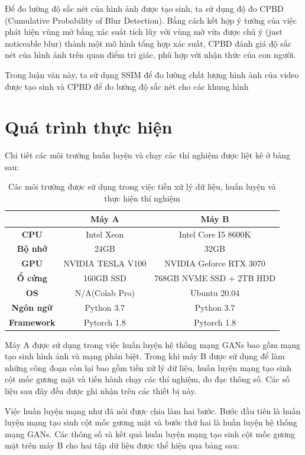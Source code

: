 Để đo lường độ sắc nét của hình ảnh được tạo sinh, ta sử dụng độ đo CPBD (Cumulative 
Probability of Blur Detection). Bằng cách kết hợp ý tưởng của việc phát hiện vùng mờ bằng xác suất tích lũy với vùng mờ vừa được chú ý (just noticeable blur) thành một mô hình tổng hợp xác suất, CPBD đánh giá độ sắc nét của hình ảnh trên quan điểm tri giác, phù hợp với nhận thức của con người.

Trong luận văn này, ta sử dụng SSIM để đo lường chất lượng hình ảnh của video được tạo sinh và CPBD để đo lường độ sắc nét cho các khung hình

\section{Quá trình thực hiện}

Chi tiết các môi trường huấn luyện và chạy các thí nghiệm được liệt kê ở bảng sau:

\begin{table}[h]
    \centering
    \begin{tabular}{c | c | c}
    \hline 
    &\textbf{Máy A} & \textbf{Máy B}\\
    \hline
    \textbf{CPU} & Intel Xeon & Intel Core I5 8600K\\
    \textbf{Bộ nhớ} & 24GB & 32GB\\
    \textbf{GPU} & NVIDIA TESLA V100 & NVIDIA Geforce RTX 3070\\
    \textbf{Ổ cứng} & 160GB SSD & 768GB NVME SSD + 2TB HDD\\
    \textbf{OS} & N/A(Colab Pro) & Ubuntu 20.04\\
    \textbf{Ngôn ngữ} & Python 3.7 & Python 3.7\\
    \textbf{Framework} & Pytorch 1.8 & Pytorch 1.8\\
    \hline
    \end{tabular}
    \caption{Các môi trường được sử dụng trong việc tiền xử lý dữ liệu, huấn luyện và thực hiện thí nghiệm}
    \label{table:hardware}
\end{table}

Máy A được sử dụng trong việc huấn luyện hệ thống mạng GANs bao gồm mạng tạo sinh hình ảnh và mạng phân biệt. Trong khi máy B được sử dụng để làm những công đoạn còn lại bao gồm tiền xử lý dữ liệu, huấn luyện mạng tạo sinh cột mốc gương mặt và tiến hành chạy các thí nghiệm, đo đạc thông số. Các số liệu sau đây đều được ghi nhận trên các thiết bị này. 

Việc huấn luyện mạng như đã nói được chia làm hai bước. Bước đầu tiên là huấn luyện mạng tạo sinh cột mốc gương mặt và bước thứ hai là huấn luyện hệ thống mạng GANs. Các thông số và kết quả huấn luyện mạng tạo sinh cột mốc gương mặt trên máy B cho hai tập dữ liệu được thể hiện qua bảng sau:

